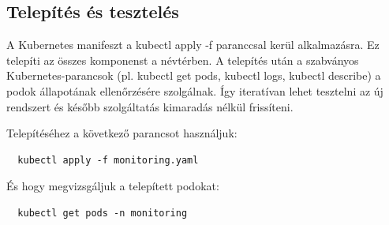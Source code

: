 \subsection{Telepítés és tesztelés}

A Kubernetes manifeszt a kubectl apply -f paranccsal kerül alkalmazásra. Ez telepíti az összes komponenst a névtérben. 
A telepítés után a szabványos Kubernetes-parancsok (pl. kubectl get pods, kubectl logs, kubectl describe) 
a podok állapotának ellenőrzésére szolgálnak. Így iteratívan lehet tesztelni az új rendszert és később 
szolgáltatás kimaradás nélkül frissíteni.

Telepítéséhez a következő parancsot használjuk:

\begin{lstlisting}
  kubectl apply -f monitoring.yaml
\end{lstlisting}

És hogy megvizsgáljuk a telepített podokat:

\begin{lstlisting}
  kubectl get pods -n monitoring
\end{lstlisting}
